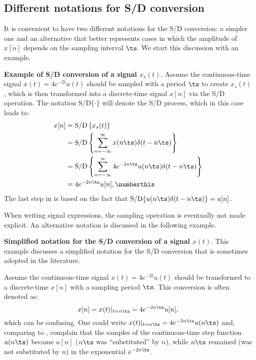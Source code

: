 \subsection{Different notations for S/D conversion}

It is convenient to have two different notations for the S/D conversion: a simpler one and an alternative
that better represents cases in which the amplitude of $x[n]$ depends on the sampling interval $\ts$. 
We start this discussion with an example.

\bExample \textbf{Example of S/D conversion of a signal $x_s(t)$}.
\label{ex:CDnotation}
Assume the continuous-time signal $x(t) = 4 e^{-2t} u(t)$ should be sampled with a period $\ts$
to create $x_s(t)$, which is then transformed into a discrete-time signal $x[n]$ via the S/D operation.
The notation $\textrm{S/D} \{ \cdot \}$ will denote the S/D process, which in this case leads to:
\begin{align*}
x[n] &= \textrm{S/D} \left\{x_s(t)\right\} \\
  &= \textrm{S/D} \left\{\sum_{n=-\infty}^{\infty} x(n\ts) \delta(t - n\ts) \right\} \\
	&= \textrm{S/D} \left\{ \sum_{n=-\infty}^{\infty} 4 e^{-2 n \ts} u(n \ts) \delta(t - n\ts) \right\} \\
	&= 4 e^{-2 n \ts} u[n], \numberthis
\label{eq:cdConversionExample2}
\end{align*}
The last step in  is based
on the fact that $\textrm{S/D} \{ u(n \ts) \delta(t - n\ts) \} = u[n]$.
\eExample

When writing signal expressions, the sampling operation is eventually not made
explicit. An alternative notation is discussed in the following example.

\bExample \textbf{Simplified notation for the S/D conversion of a signal $x(t)$}.
\label{ex:simplifiedCD}
This example discusses a simplified notation for the S/D conversion that is sometimes
adopted in the literature.

Assume the continuous-time signal $x(t) = 4 e^{-2t} u(t)$ should be transformed to a 
discrete-time $x[n]$ with a sampling period $\ts$.
This conversion is often denoted as:
\begin{equation}
x[n] = x(t)|_{t=n \ts} = 4 e^{-2 n \ts} u[n],
\label{eq:cdConversionExample1}
\end{equation}
which can be confusing. One could write $x(t)|_{t=n \ts} = 4 e^{-2 n \ts} u(n \ts)$ and, comparing to , complain that the samples of the continuous-time step function $u(n \ts)$ 
became $u[n]$ ($n\ts$ was ``substituted'' by $n$), while $n\ts$ remained (was not substituted
by $n$) in the exponential $e^{-2 n \ts}$. 

